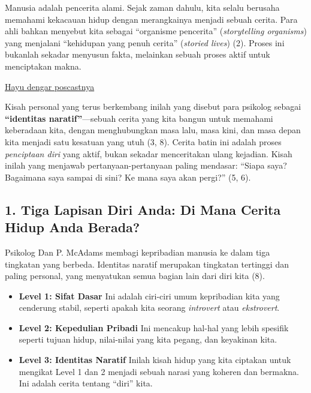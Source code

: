 \documentclass[
  letterpaper,
  DIV=11,
  numbers=noendperiod]{scrreprt}
\begin{document}
Manusia adalah pencerita alami. Sejak zaman dahulu, kita selalu berusaha
memahami kekacauan hidup dengan merangkainya menjadi sebuah cerita. Para
ahli bahkan menyebut kita sebagai ``organisme pencerita''
(\emph{storytelling organisms}) yang menjalani ``kehidupan yang penuh
cerita'' (\emph{storied lives}) (2). Proses ini bukanlah sekadar
menyusun fakta, melainkan sebuah proses aktif untuk menciptakan makna.

\href{./audio/Identitas_Naratif__Jadi_Sutradara_dan_Penulis_Kisah_Hidup_Anda_.mp4}{Hayu
dengar poscastnya}

Kisah personal yang terus berkembang inilah yang disebut para psikolog
sebagai \textbf{``identitas naratif''}---sebuah cerita yang kita bangun
untuk memahami keberadaan kita, dengan menghubungkan masa lalu, masa
kini, dan masa depan kita menjadi satu kesatuan yang utuh (3, 8). Cerita
batin ini adalah proses \emph{penciptaan diri} yang aktif, bukan sekadar
menceritakan ulang kejadian. Kisah inilah yang menjawab
pertanyaan-pertanyaan paling mendasar: ``Siapa saya? Bagaimana saya
sampai di sini? Ke mana saya akan pergi?'' (5, 6).

\subsection{\texorpdfstring{\textbf{1. Tiga Lapisan Diri Anda: Di Mana
Cerita Hidup Anda
Berada?}}{1. Tiga Lapisan Diri Anda: Di Mana Cerita Hidup Anda Berada?}}\label{tiga-lapisan-diri-anda-di-mana-cerita-hidup-anda-berada}

Psikolog Dan P. McAdams membagi kepribadian manusia ke dalam tiga
tingkatan yang berbeda. Identitas naratif merupakan tingkatan tertinggi
dan paling personal, yang menyatukan semua bagian lain dari diri kita
(8).

\begin{itemize}
\item
  \textbf{Level 1: Sifat Dasar} Ini adalah ciri-ciri umum kepribadian
  kita yang cenderung stabil, seperti apakah kita seorang
  \emph{introvert} atau \emph{ekstrovert}.
\item
  \textbf{Level 2: Kepedulian Pribadi} Ini mencakup hal-hal yang lebih
  spesifik seperti tujuan hidup, nilai-nilai yang kita pegang, dan
  keyakinan kita.
\item
  \textbf{Level 3: Identitas Naratif} Inilah kisah hidup yang kita
  ciptakan untuk mengikat Level 1 dan 2 menjadi sebuah narasi yang
  koheren dan bermakna. Ini adalah cerita tentang ``diri'' kita.
\end{itemize}
\end{document}
